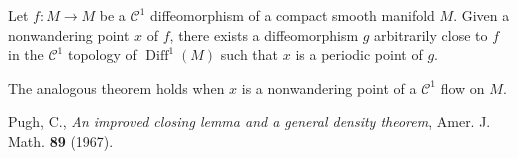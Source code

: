 \documentclass[12pt]{article}
\begin{document}
Let $f:M\to M$ be a $\mathcal{C}^1$ diffeomorphism of a compact smooth manifold $M$. Given a nonwandering point $x$ of $f$, there exists a diffeomorphism $g$ arbitrarily close to $f$ in the $\mathcal{C}^1$ topology of $\operatorname{Diff}^1(M)$ such that $x$ is a periodic point of $g$.

The analogous theorem holds when $x$ is a nonwandering point of a $\mathcal{C}^1$ flow on $M$.

\begin{thebibliography}{9}
 Pugh, C., \emph{An improved closing lemma and a general density theorem}, Amer. J. Math. \textbf{89} (1967).
\end{thebibliography}
\end{document}
